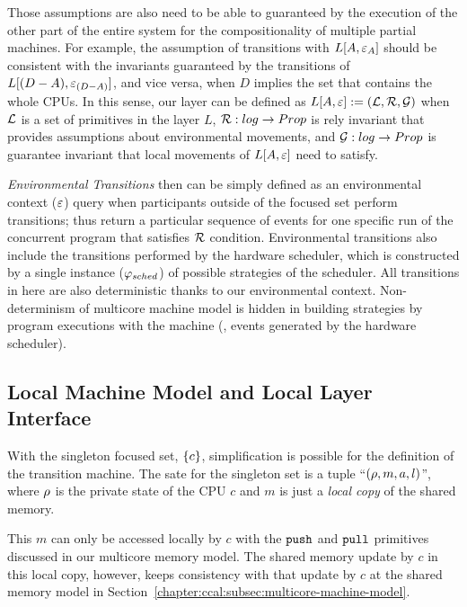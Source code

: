 Those assumptions are also need to be able to guaranteed by the execution of the other part of the entire system for 
the compositionality of multiple partial machines.
For example, the assumption of transitions with $L[A, {\varepsilon}_{A}]$ should be consistent with the invariants guaranteed by the transitions of $L[(D - A), {\varepsilon}_{(D-A)}]$, and vice versa, when $D$ implies the set that contains the whole CPUs.
In this sense, our layer can be defined as
$L[A, {\varepsilon}] := (\mathcal{L}, \mathcal{R},\mathcal{G})$ when $\mathcal{L}$ is a set of primitives in the layer $L$,
$\mathcal{R} : log \rightarrow Prop$ is  rely invariant that provides assumptions about  environmental movements,
and $\mathcal{G}: log \rightarrow Prop$ is guarantee invariant that local movements of $L[A, {\varepsilon}]$ need to satisfy.

\emph{Environmental Transitions} then can be simply defined as 
an environmental context (${\varepsilon}$) query when participants outside of the focused set perform transitions;
thus return a particular sequence of events for one specific run of the concurrent program 
that satisfies $\mathcal{R}$ condition.
Environmental transitions also include the transitions performed by 
the hardware scheduler, which is constructed by 
a single instance ($\varphi_{sched}$) of possible strategies of the scheduler.
All transitions in here are also deterministic thanks to our environmental context.
Non-determinism of multicore machine model is hidden in building strategies by
program executions with the machine (\eg, events generated by the hardware scheduler).

\subsection{Local Machine Model and Local Layer Interface}
\label{chapter:ccal:subsec:local-layer-interface}

With the singleton focused set, $\{c\}$, 
simplification is possible for the definition of the transition machine.
The sate for the singleton set is a tuple ``$(\rho, m, a, l)$'',
where $\rho$ is the private state of the CPU $c$
and $m$ is just a \emph{local copy} of the shared memory.


This $m$ can only be accessed locally by $c$ with the ${\mathrm{\texttt{push}}}$ and ${\mathrm{\texttt{pull}}}$ primitives discussed in our multicore memory model. 
The shared  memory update by $c$ in this local copy, however, 
keeps consistency with 
that update by $c$ at the shared memory model in
Section~\ref{chapter:ccal:subsec:multicore-machine-model}.

